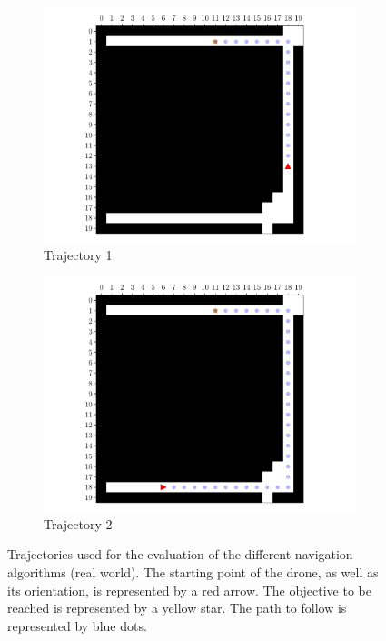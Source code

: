 \begin{figure}[H]
    \centering
    \begin{subfigure}{0.49\textwidth}
        \centering
        \includegraphics[width=\textwidth]{resources/pdf/07/evaluation/0.pdf}
        \caption{Trajectory 1}
    \end{subfigure}
    \hfill
    \begin{subfigure}{0.49\textwidth}
        \centering
        \includegraphics[width=\textwidth]{resources/pdf/07/evaluation/1.pdf}
        \caption{Trajectory 2}
    \end{subfigure}
    \caption{Trajectories used for the evaluation of the different navigation algorithms (real world). The starting point of the drone, as well as its orientation, is represented by a red arrow. The objective to be reached is represented by a yellow star. The path to follow is represented by blue dots.}
    \label{fig:07.evaluation.trajectories}
\end{figure}


